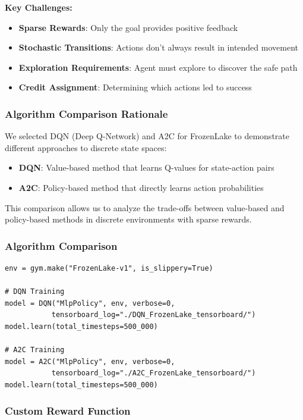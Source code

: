 \documentclass[12pt]{article}
\begin{document}
{{{\textbf{Key Challenges:}
\begin{itemize}
    \item \textbf{Sparse Rewards}: Only the goal provides positive feedback
    \item \textbf{Stochastic Transitions}: Actions don't always result in intended movement
    \item \textbf{Exploration Requirements}: Agent must explore to discover the safe path
    \item \textbf{Credit Assignment}: Determining which actions led to success
\end{itemize}

\subsubsection{Algorithm Comparison Rationale}

We selected DQN (Deep Q-Network) and A2C for FrozenLake to demonstrate different approaches to discrete state spaces:

\begin{itemize}
    \item \textbf{DQN}: Value-based method that learns Q-values for state-action pairs
    \item \textbf{A2C}: Policy-based method that directly learns action probabilities
\end{itemize}

This comparison allows us to analyze the trade-offs between value-based and policy-based methods in discrete environments with sparse rewards.

\subsubsection{Algorithm Comparison}

\begin{verbatim}
env = gym.make("FrozenLake-v1", is_slippery=True)

# DQN Training
model = DQN("MlpPolicy", env, verbose=0, 
           tensorboard_log="./DQN_FrozenLake_tensorboard/")
model.learn(total_timesteps=500_000)

# A2C Training  
model = A2C("MlpPolicy", env, verbose=0, 
           tensorboard_log="./A2C_FrozenLake_tensorboard/")
model.learn(total_timesteps=500_000)
\end{verbatim}

\subsubsection{Custom Reward Function}

}}}
\end{document}
